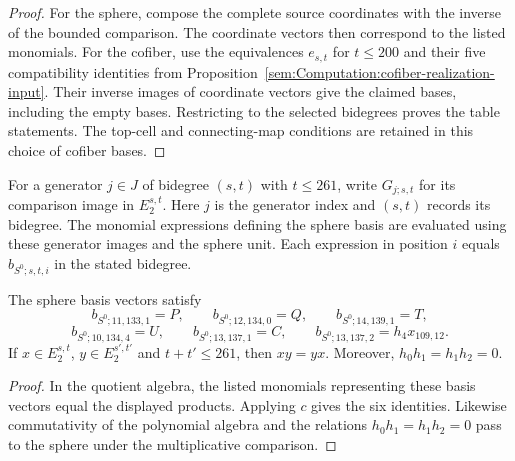 \begin{proof}
For the sphere, compose the complete source coordinates with the inverse
of the bounded comparison. The coordinate vectors then correspond to
the listed monomials. For the cofiber, use the equivalences
$e_{s,t}$ for $t\leq200$ and their five compatibility identities from
Proposition~\ref{sem:Computation:cofiber-realization-input}. Their inverse
images of coordinate vectors give the claimed bases, including the empty
bases. Restricting to the selected bidegrees proves the table statements.
The top-cell and connecting-map conditions are retained in this choice
of cofiber bases.
\end{proof}


\begin{theorem}
\label{sem:Computation:named-basis-identities}
For a generator $j\in J$ of bidegree $(s,t)$ with $t\leq261$,
write $G_{j;s,t}$ for its comparison image in $E_2^{s,t}$.
Here $j$ is the generator index and $(s,t)$ records its bidegree.
The monomial expressions defining the sphere basis are evaluated
using these generator images and the sphere unit. Each expression in
position $i$ equals $b_{S^0;s,t,i}$ in the stated bidegree.

The sphere basis vectors satisfy
\[b_{S^0;11,133,1}=P,\qquad b_{S^0;12,134,0}=Q,\qquad b_{S^0;14,139,1}=T,\]
\[b_{S^0;10,134,4}=U,\qquad b_{S^0;13,137,1}=C,\qquad b_{S^0;13,137,2}=h_4x_{109,12}.\]
If $x\in E_2^{s,t}$, $y\in E_2^{s\prime,t\prime}$ and $t+t\prime\leq261$, then $xy=yx$. Moreover, $h_0h_1=h_1h_2=0$.
\end{theorem}
\begin{proof}
In the quotient algebra, the listed monomials representing these basis
vectors equal the displayed products. Applying $c$ gives the six
identities. Likewise commutativity of the polynomial algebra and the
relations $h_0h_1=h_1h_2=0$ pass to the sphere under the multiplicative
comparison.
\end{proof}


